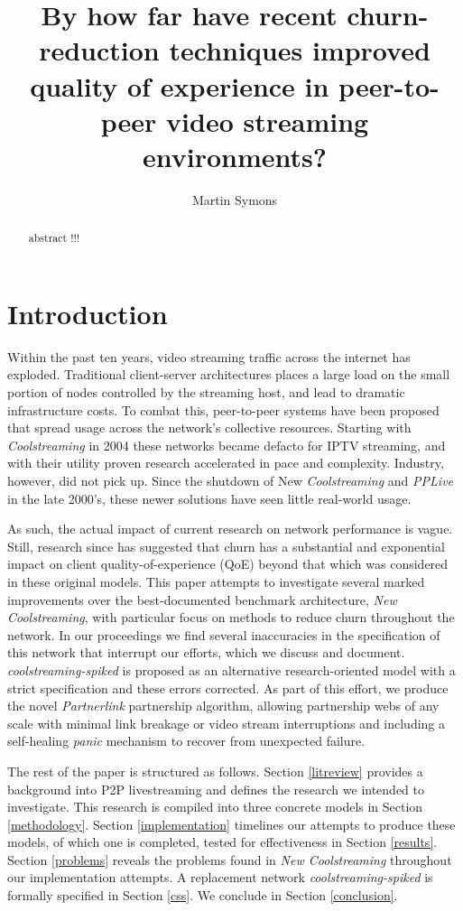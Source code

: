 \documentclass[12pt,a4paper]{article}
\title{By how far have recent churn-reduction techniques improved quality of experience in peer-to-peer video streaming environments?}
\author{Martin Symons}
\begin{document}
\maketitle

\begin{abstract}
abstract !!! 
\end{abstract}

\section{Introduction} \label{introduction}
Within the past ten years, video streaming traffic across the internet has exploded. Traditional client-server architectures places a large load on the small portion of nodes controlled by the streaming host, and lead to dramatic infrastructure costs. To combat this, peer-to-peer systems have been proposed that spread usage across the network's collective resources. Starting with \textit{Coolstreaming} in 2004 these networks became defacto for IPTV streaming, and with their utility proven research accelerated in pace and complexity. Industry, however, did not pick up. Since the shutdown of New \textit{Coolstreaming} and \textit{PPLive} in the late 2000's, these newer solutions have seen little real-world usage.

As such, the actual impact of current research on network performance is vague. Still, research since has suggested that churn has a substantial and exponential impact on client quality-of-experience (QoE) beyond that which was considered in these original models. This paper attempts to investigate several marked improvements over the best-documented benchmark architecture, \textit{New Coolstreaming}, with particular focus on methods to reduce churn throughout the network. In our proceedings we find several inaccuracies in the specification of this network that interrupt our efforts, which we discuss and document. \textit{coolstreaming-spiked} is proposed as an alternative research-oriented model with a strict specification and these errors corrected. As part of this effort, we produce the novel \textit{Partnerlink} partnership algorithm, allowing partnership webs of any scale with minimal link breakage or video stream interruptions and including a self-healing \textit{panic} mechanism to recover from unexpected failure.

The rest of the paper is structured as follows. Section \ref{litreview} provides a background into P2P livestreaming and defines the research we intended to investigate. This research is compiled into three concrete models in Section \ref{methodology}. Section \ref{implementation} timelines our attempts to produce these models, of which one is completed, tested for effectiveness in Section \ref{results}. Section \ref{problems} reveals the problems found in \textit{New Coolstreaming} throughout our implementation attempts. A replacement network \textit{coolstreaming-spiked} is formally specified in Section \ref{css}. We conclude in Section \ref{conclusion}.
\end{document}
